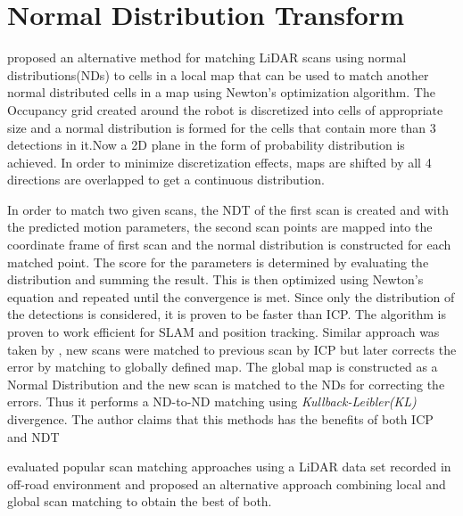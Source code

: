 \section{Normal Distribution Transform}
\cite{P.Biber} proposed an alternative method for matching LiDAR scans using normal distributions(NDs) to cells in a local map that can be used to match another normal distributed cells in a map using Newton's optimization algorithm. The Occupancy grid created around the robot is discretized into cells of appropriate size and a normal distribution is formed for the cells that contain more than 3 detections in it.Now a 2D plane in the form of probability distribution is achieved. In order to minimize discretization effects, maps are shifted by all 4 directions are overlapped to get a continuous distribution.
\par
    In order to match two given scans, the NDT of the first scan is created and with the predicted motion parameters, the second scan points are mapped into the coordinate frame of first 
scan and the normal distribution is constructed for each matched point. The score for the parameters is determined by evaluating the distribution and summing the result. This is then optimized using Newton's equation and repeated until the convergence is met. Since only the distribution of the detections is considered, it is proven to be faster than ICP. The algorithm is proven to work efficient for SLAM and position tracking. Similar approach was taken by \cite{K.Ryu}, new scans were matched to previous scan by ICP but later corrects the error by matching to globally defined map. The global map is constructed as a Normal Distribution and the new scan is matched to the NDs for correcting the errors. Thus it performs a ND-to-ND matching using \textit{Kullback-Leibler(KL)} divergence. The author claims that this methods has the benefits of both ICP and NDT
\par
\cite{HaoFU} evaluated popular scan matching approaches using a LiDAR data set recorded in off-road environment and proposed an alternative approach combining local and global  scan matching to obtain the best of both.

